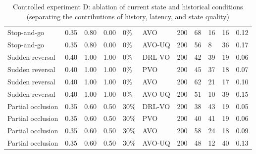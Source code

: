 \documentclass[10pt,a4paper,twocolumn]{article}
\begin{document}
\begin{table}[!t]
{\begin{tabular}{p{}p{}p{}p{}p{}p{}p{}p{}p{}p{}p{}}
        Stop-and-go & 0.35 & 0.80 & 0.00 & 0\% & AVO & 200 & 68 & 16 & 16 & 0.12 \\
        Stop-and-go & 0.35 & 0.80 & 0.00 & 0\% & AVO-UQ & 200 & 56 & 8 & 36 & 0.17 \\
        Sudden reversal & 0.40 & 1.00 & 1.00 & 0\% & DRL-VO & 200 & 42 & 39 & 19 & 0.06 \\
        Sudden reversal & 0.40 & 1.00 & 1.00 & 0\% & PVO & 200 & 45 & 37 & 18 & 0.07 \\
        Sudden reversal & 0.40 & 1.00 & 1.00 & 0\% & AVO & 200 & 62 & 21 & 17 & 0.10 \\
        Sudden reversal & 0.40 & 1.00 & 1.00 & 0\% & AVO-UQ & 200 & 51 & 10 & 39 & 0.15 \\
        Partial occlusion & 0.35 & 0.60 & 0.50 & 30\% & DRL-VO & 200 & 38 & 43 & 19 & 0.05 \\
        Partial occlusion & 0.35 & 0.60 & 0.50 & 30\% & PVO & 200 & 40 & 41 & 19 & 0.06 \\
        Partial occlusion & 0.35 & 0.60 & 0.50 & 30\% & AVO & 200 & 58 & 24 & 18 & 0.09 \\
        Partial occlusion & 0.35 & 0.60 & 0.50 & 30\% & AVO-UQ & 200 & 48 & 12 & 40 & 0.13 \\
        \bottomrule
    \end{tabular}}
\par
\vspace{8pt}
\centering
    \caption{Controlled experiment D: ablation of current state and historical conditions (separating the contributions of history, latency, and state quality)}
    \label{tab:controlled_history}
    \scriptsize
\end{table}
\end{document}
